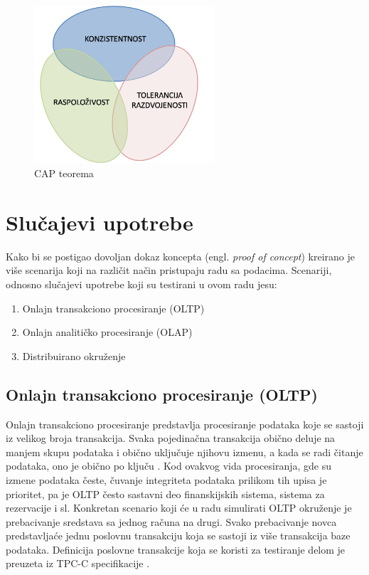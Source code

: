 \documentclass[12pt,oneside]{memoir}
\begin{document}
\begin{figure}[!ht]
  \centering
  \includegraphics[width=0.6\textwidth]{cap.png}
  \caption{CAP teorema}
  \label{fig:grafikon}
\end{figure}

\chapter{Slučajevi upotrebe}

Kako bi se postigao dovoljan dokaz koncepta (engl. \textit{proof of concept}) kreirano je više scenarija koji na različit način pristupaju radu sa podacima. Scenariji, odnosno slučajevi upotrebe koji su testirani u ovom radu jesu: 
\begin{enumerate}
\item Onlajn transakciono procesiranje (OLTP)
\item Onlajn analitičko procesiranje (OLAP)
\item Distribuirano okruženje
\end{enumerate}


\section{Onlajn transakciono procesiranje (OLTP)}
Onlajn transakciono procesiranje predstavlja procesiranje podataka koje se sastoji iz velikog broja transakcija.  Svaka pojedinačna transakcija obično deluje na manjem skupu podataka i obično uključuje njihovu izmenu, a kada se radi čitanje podataka, ono je obično po ključu \cite{oltp}. Kod ovakvog vida procesiranja, gde su izmene podataka česte, čuvanje integriteta podataka prilikom tih upisa je prioritet, pa je OLTP često sastavni deo finanskijskih sistema, sistema za rezervacije i sl.
Konkretan scenario koji će u radu simulirati OLTP okruženje je prebacivanje sredstava sa jednog računa na drugi. Svako prebacivanje novca predstavljaće jednu poslovnu transakciju koja se sastoji iz više transakcija baze podataka. Definicija poslovne transakcije koja se koristi za testiranje delom je preuzeta iz TPC-C specifikacije \cite{tpcc}. 
\end{document}
